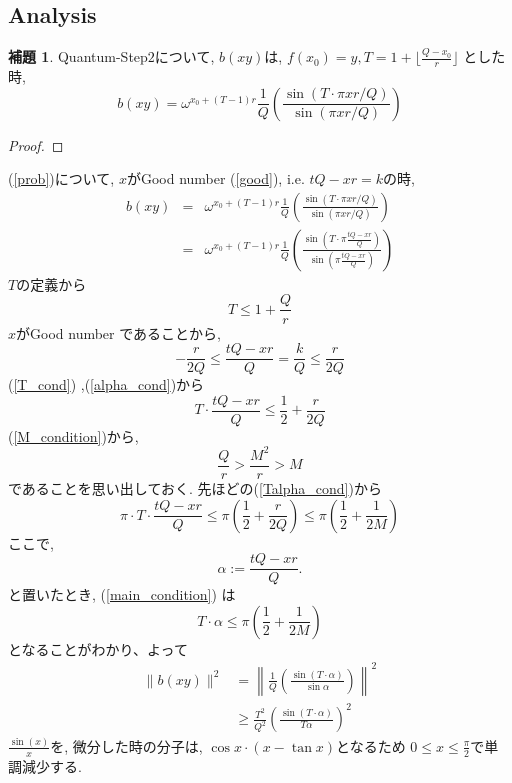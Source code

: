 \documentclass{jsarticle}
\theoremstyle{definition}
\newtheorem{lemma}[theorem]{補題}
\begin{document}
\subsection{Analysis}
\begin{lemma}
Quantum-Step$2$について, $b(xy)$は,  $f(x_0)=y, T=1+  \lfloor \frac{Q-x_0}{r} \rfloor$ とした時, 
\begin{equation}\label{prob}
b(xy)=\omega^{x_0 +(T-1)r}\frac{1}{Q}\left( \frac{\sin (T\cdot \pi xr /Q )}{\sin (\pi x r / Q)}\right)
\end{equation}
\end{lemma}
\begin{proof}
\end{proof}
(\ref{prob})について, $x$がGood number (\ref{good}), i.e. $t Q-xr=k$の時, 
$$\begin{array}{ccc}
b(xy)&=&\omega^{x_0 +(T-1)r}\frac{1}{Q}\left( \frac{\sin (T\cdot \pi xr /Q )}{\sin (\pi x r / Q)}\right)\\
       &=&\omega^{x_0 +(T-1)r}\frac{1}{Q}\left( \frac{\sin (T\cdot \pi \frac{ tQ-xr }{ Q} )}{\sin (\pi \frac{tQ-xr}{ Q})}\right)
\end{array}
$$
$T$の定義から
\begin{equation}\label{T_cond}
T \leq 1+ \frac{Q}{r}
\end{equation}
$x$がGood number であることから,
\begin{equation}\label{alpha_cond}
-\frac{r}{2Q} \leq \frac{ tQ-xr }{ Q} =\frac{k}{Q} \leq \frac{r}{2Q}
\end{equation}
(\ref{T_cond}) ,(\ref{alpha_cond})から
\begin{equation}\label{Talpha_cond}
T\cdot \frac{ tQ-xr }{ Q} \leq \frac{1}{2}+ \frac{r}{2Q}
\end{equation} 
(\ref{M_condition})から, 
\begin{equation}
\frac{Q}{r} >\frac{M^2}{ r} > M 
\end{equation}
であることを思い出しておく. 先ほどの(\ref{Talpha_cond})から
\begin{equation}\label{main_condition}
\pi \cdot T\cdot \frac{ tQ-xr }{ Q}  \leq  \pi \left( \frac{1}{2}+ \frac{r}{2Q} \right) \leq \pi \left( \frac{1}{2}+ \frac{1}{2M}\right)
\end{equation}
ここで, 
\begin{equation}
\alpha:=\frac{ tQ-xr }{ Q}. 
\end{equation}
と置いたとき, (\ref{main_condition}) は
\begin{equation}
T\cdot \alpha \leq \pi \left( \frac{1}{2}+ \frac{1}{2M}\right)
\end{equation}
となることがわかり、よって
\begin{align}
\|b(xy)\|^2&=\left\| \frac{1}{Q} \left( \frac{ \sin (T\cdot \alpha  ) }{\sin \alpha } \right) \right\| ^2\\
        &\geq \frac{T^2}{Q^2}  \left( \frac{ \sin (T\cdot \alpha  ) }{T \alpha } \right) ^2
\end{align}
$\frac{ \sin (x  ) }{x}$を, 微分した時の分子は, $\cos x \cdot (x-\tan x)$となるため $0\leq x \leq \frac{\pi}{2}$で単調減少する.
\end{document}
